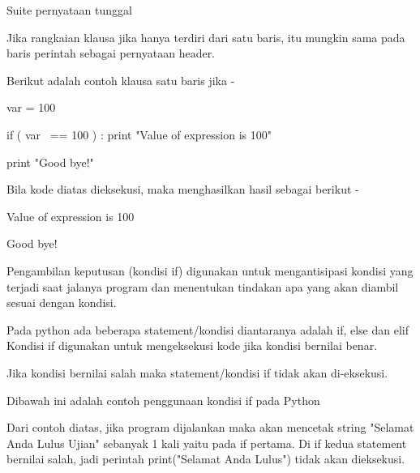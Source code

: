 \vspace{12pt}
\noindent 
Suite pernyataan tunggal \par
\vspace{12pt}
\noindent 
Jika rangkaian $  $klausa $  $jika $  $hanya terdiri dari satu baris, itu mungkin sama pada baris perintah sebagai pernyataan header. \par
\vspace{12pt}
\noindent 
Berikut adalah contoh $  $klausa $  $satu baris jika $  $- \par
\vspace{12pt}
\vspace{12pt}
\noindent 
var = 100 \par
\vspace{12pt}
\noindent 
if ( var~ == 100 ) : print "Value of expression is 100" \par
\vspace{12pt}
\noindent 
print "Good bye!" \par
\vspace{12pt}
\noindent 
Bila kode diatas dieksekusi, maka menghasilkan hasil sebagai berikut - \par
\vspace{12pt}
\noindent 
Value of expression is 100 \par
\vspace{12pt}
\noindent 
Good bye! \hspace*{1.31in}  \par
\noindent 
\vspace{12pt}
\noindent 
Pengambilan keputusan (kondisi if) digunakan untuk mengantisipasi kondisi yang terjadi saat jalanya program dan menentukan tindakan apa yang akan diambil sesuai dengan kondisi. \par
\noindent 
\vspace{12pt}
\noindent 
Pada python ada beberapa statement/kondisi diantaranya adalah $  $if, $  $else $  $dan $  $elif $  $Kondisi $  $if $  $digunakan untuk mengeksekusi kode jika kondisi bernilai benar. \par
\noindent 
\vspace{12pt}
\noindent 
Jika kondisi bernilai salah maka statement/kondisi if tidak akan di-eksekusi. \par
\noindent 
\vspace{\baselineskip}
Dibawah ini adalah contoh penggunaan kondisi if pada Python \par
\noindent 
\vspace{\baselineskip}
Dari contoh diatas, jika program dijalankan maka akan mencetak string "Selamat Anda Lulus Ujian" sebanyak 1 kali yaitu pada if pertama. Di if kedua statement bernilai salah, jadi perintah $  $print("Selamat Anda Lulus") $  $tidak akan dieksekusi. \par
